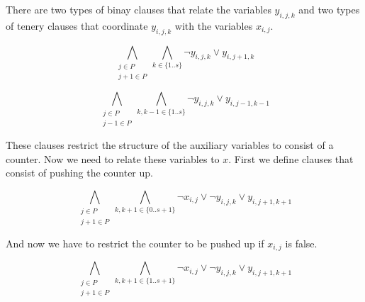 \documentclass[]{llncs}
\begin{document}
There are two types of binay clauses that relate the variables
$y_{i,j,k}$ and two types of tenery clauses that coordinate $y_{i,j,k}$
with the variables $x_{i,j}$.

\begin{equation}
    \bigwedge_{\substack{j \in P \\ j+1\in P}} \bigwedge_{k\in\{1..s\}}
    \neg y_{i,j,k} \vee y_{i,j+1,k}
\end{equation}

\begin{equation}
    \bigwedge_{\substack{j \in P \\ j-1\in P}} \bigwedge_{k,k-1\in\{1..s\}}
    \neg y_{i,j,k} \vee y_{i,j-1,k-1}
\end{equation}

These clauses restrict the structure of the auxiliary variables to
consist of a counter. Now we need to relate these variables to $x$. 
First we define clauses that consist of pushing the counter up. 

\begin{equation}
    \bigwedge_{\substack{j \in P \\ j+1\in P}} \bigwedge_{k,k+1\in\{0..s+1\}}
    \neg x_{i,j} \vee \neg y_{i,j,k} \vee y_{i,j+1,k+1}
\end{equation}

And now we have to restrict the counter to be pushed up if $x_{i,j}$ is
false. 

\begin{equation}
    \bigwedge_{\substack{j \in P \\ j+1\in P}} \bigwedge_{k,k+1\in\{1..s+1\}}
    \neg x_{i,j} \vee \neg y_{i,j,k} \vee y_{i,j+1,k+1}
\end{equation}
\end{document}
